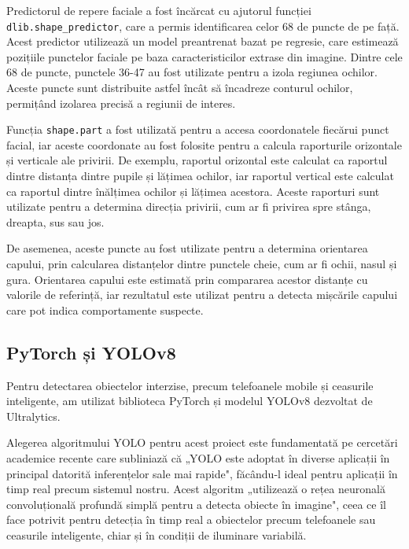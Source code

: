 \documentclass[12pt,a4paper]{article}
\begin{document}
Predictorul de repere faciale a fost încărcat cu ajutorul funcției \texttt{dlib.shape\_predictor}, care a permis identificarea celor 68 de puncte de pe față. Acest predictor utilizează un model preantrenat bazat pe regresie, care estimează pozițiile punctelor faciale pe baza caracteristicilor extrase din imagine. Dintre cele 68 de puncte, punctele 36-47 au fost utilizate pentru a izola regiunea ochilor. Aceste puncte sunt distribuite astfel încât să încadreze conturul ochilor, permițând izolarea precisă a regiunii de interes.

Funcția \texttt{shape.part} a fost utilizată pentru a accesa coordonatele fiecărui punct facial, iar aceste coordonate au fost folosite pentru a calcula raporturile orizontale și verticale ale privirii. De exemplu, raportul orizontal este calculat ca raportul dintre distanța dintre pupile și lățimea ochilor, iar raportul vertical este calculat ca raportul dintre înălțimea ochilor și lățimea acestora. Aceste raporturi sunt utilizate pentru a determina direcția privirii, cum ar fi privirea spre stânga, dreapta, sus sau jos.

De asemenea, aceste puncte au fost utilizate pentru a determina orientarea capului, prin calcularea distanțelor dintre punctele cheie, cum ar fi ochii, nasul și gura. Orientarea capului este estimată prin compararea acestor distanțe cu valorile de referință, iar rezultatul este utilizat pentru a detecta mișcările capului care pot indica comportamente suspecte.

\subsection{PyTorch și YOLOv8}
Pentru detectarea obiectelor interzise, precum telefoanele mobile și ceasurile inteligente, am utilizat biblioteca PyTorch\cite{pytorch} și modelul YOLOv8 dezvoltat de Ultralytics\cite{ultralytics}. 

Alegerea algoritmului YOLO pentru acest proiect este fundamentată pe cercetări academice recente care 
subliniază că „YOLO este adoptat în diverse aplicații în principal datorită inferențelor sale mai 
rapide"\cite{yolo_research}, făcându-l ideal pentru aplicații în timp real precum sistemul nostru. 
Acest algoritm „utilizează o rețea neuronală convoluțională profundă simplă pentru a detecta obiecte 
în imagine"\cite{yolo_algorithm}, ceea ce îl face potrivit pentru detecția în timp real a obiectelor precum 
telefoanele sau ceasurile inteligente, chiar și în condiții de iluminare variabilă.
\end{document}
